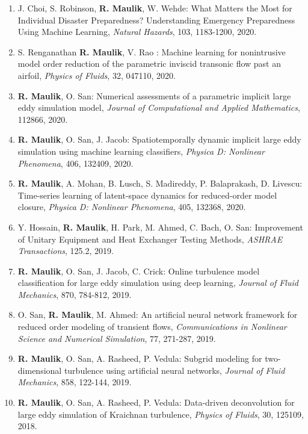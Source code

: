 \documentclass[letterpaper]{article}
\begin{document}
\begin{enumerate}
\item J. Choi, S. Robinson, \textbf{R. Maulik}, W. Wehde: What Matters the Most for Individual Disaster Preparedness? Understanding Emergency Preparedness Using Machine Learning, {\it Natural Hazards}, 103, 1183-1200, 2020. 

\item S. Renganathan \textbf{R. Maulik}, V. Rao : Machine learning for nonintrusive model order reduction of the parametric inviscid transonic flow past an airfoil, {\it Physics of Fluids}, 32, 047110, 2020. 

\item \textbf{R. Maulik}, O. San: Numerical assessments of a parametric implicit large eddy simulation model, {\it Journal of Computational and Applied Mathematics}, 112866, 2020.

\item \textbf{R. Maulik}, O. San, J. Jacob: Spatiotemporally dynamic implicit large eddy simulation using machine learning classifiers, {\it Physica D: Nonlinear Phenomena}, 406, 132409, 2020. 

\item \textbf{R. Maulik}, A. Mohan, B. Lusch, S. Madireddy, P. Balaprakash, D. Livescu: Time-series learning of latent-space dynamics for reduced-order model closure, {\it Physica D: Nonlinear Phenomena}, 405, 132368, 2020. 

\item Y. Hossain, \textbf{R. Maulik}, H. Park, M. Ahmed, C. Bach, O. San: Improvement of Unitary Equipment and Heat Exchanger Testing Methods, {\it ASHRAE Transactions}, 125.2, 2019. 

\item \textbf{R. Maulik}, O. San, J. Jacob, C. Crick: Online turbulence model classification for large eddy simulation using deep learning, {\it Journal of Fluid Mechanics}, 870, 784-812, 2019. 

\item O. San, \textbf{R. Maulik}, M. Ahmed: An artificial neural network framework for reduced order modeling of transient flows, {\it Communications in Nonlinear Science and Numerical Simulation}, 77, 271-287, 2019. 

\item \textbf{R. Maulik}, O. San, A. Rasheed, P. Vedula: Subgrid modeling for two-dimensional turbulence using artificial neural networks, {\it Journal of Fluid Mechanics}, 858, 122-144, 2019. 

\item \textbf{R. Maulik}, O. San, A. Rasheed, P. Vedula: Data-driven deconvolution for large eddy simulation of Kraichnan turbulence, {\it Physics of Fluids}, 30, 125109, 2018. 


\end{enumerate}
\end{document}
